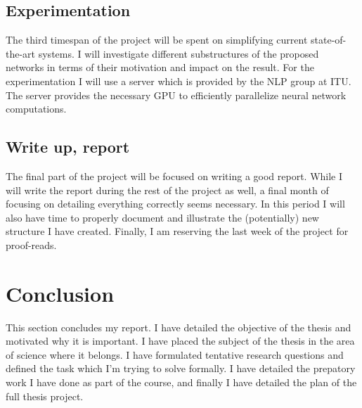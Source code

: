 \documentclass[12pt]{article}
\begin{document}
\subsection{Experimentation}
The third timespan of the project will be spent on simplifying current state-of-the-art systems. I will investigate different substructures of the proposed networks in terms of their motivation and impact on the result. For the experimentation I will use a server which is provided by the NLP group at ITU. The server provides the necessary GPU to efficiently parallelize neural network computations.  

\subsection{Write up, report}
The final part of the project will be focused on writing a good report. While I will write the report during the rest of the project as well, a final month of focusing on detailing everything correctly seems necessary. In this period I will also have time to properly document and illustrate the (potentially) new structure I have created. 
Finally, I am reserving the last week of the project for proof-reads.


\section{Conclusion}
This section concludes my report. I have detailed the objective of the thesis and motivated why it is important. I have placed the subject of the thesis in the area of science where it belongs. I have formulated tentative research questions and defined the task which I'm trying to solve formally. I have detailed the prepatory work I have done as part of the course, and finally I have detailed the plan of the full thesis project.





    
\end{document}
